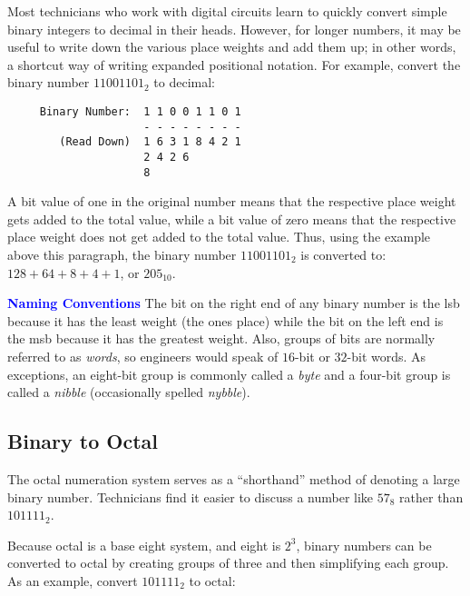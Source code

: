 Most technicians who work with digital circuits learn to quickly convert simple binary integers to decimal in their heads. However, for longer numbers, it may be useful to write down the various place weights and add them up; in other words, a shortcut way of writing expanded positional notation. For example, convert the binary number $ 11001101_2 $ to decimal: 

\begin{verbatim}
     Binary Number:  1 1 0 0 1 1 0 1
                     - - - - - - - - 
        (Read Down)  1 6 3 1 8 4 2 1 
                     2 4 2 6     
                     8 
\end{verbatim}

A bit value of one in the original number means that the respective place weight gets added to the total value, while a bit value of zero means that the respective place weight does not get added to the total value. Thus, using the example above this paragraph, the binary number $ 11001101_2 $ is converted to: $ 128+64+8+4+1 $, or $ 205_{10} $.

\bigskip

\begin{tcolorbox}[colback=blue!5!white,colframe=blue!75!black]
  \textcolor{blue}{\textbf{Naming Conventions}}
  \tcblower
  The bit on the right end of any binary number is the \gls{lsb} because it has the least weight (the ones place) while the bit on the left end is the \gls{msb} because it has the greatest weight. Also, groups of bits are normally referred to as \emph{words}, so engineers would speak of $ 16 $-bit or $ 32 $-bit words. As exceptions, an eight-bit group is commonly called a \emph{byte} and a four-bit group is called a \emph{nibble} (occasionally spelled \emph{nybble}).
\end{tcolorbox}

\subsection{Binary to Octal}
\label{MF:sub:binary_to_octal}
The octal numeration system serves as a ``shorthand'' method of denoting a large binary number. Technicians find it easier to discuss a number like $ 57_8 $ rather than $ 101111_2 $.

Because octal is a base eight system, and eight is $ 2^3 $, binary numbers can be converted to octal by creating groups of three and then simplifying each group. As an example, convert $ 101111_2 $ to octal: 

